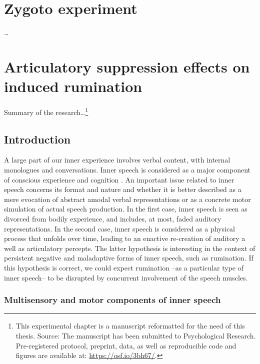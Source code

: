 \documentclass[12pt,]{book}
\let\rmarkdownfootnote\footnote%
\def\footnote{\protect\rmarkdownfootnote}
\theoremstyle{definition}
\theoremstyle{definition}
\theoremstyle{definition}
\theoremstyle{remark}
\begin{document}
\chapter{Zygoto experiment}\label{zygoto-experiment}

\ldots{}

\chapter{Articulatory suppression effects on induced
rumination}\label{articulatory-suppression-effects-on-induced-rumination}

Summary of the research\ldots{}\footnote{This experimental chapter is a
  manuscript reformatted for the need of this thesis. Source: The
  manuscript has been submitted to Psychological Research.
  Pre-registered protocol, preprint, data, as well as reproducible code
  and figures are available at: \url{https://osf.io/3bh67/}.}

\section{Introduction}\label{introduction-1}

A large part of our inner experience involves verbal content, with
internal monologues and conversations. Inner speech is considered as a
major component of conscious experience and cognition
\citep{Hubbard2010, Klinger1987, Hurlburt2013}. An important issue
related to inner speech concerns its format and nature and whether it is
better described as a mere evocation of abstract amodal verbal
representations or as a concrete motor simulation of actual speech
production. In the first case, inner speech is seen as divorced from
bodily experience, and includes, at most, faded auditory
representations. In the second case, inner speech is considered as a
physical process that unfolds over time, leading to an enactive
re-creation of auditory a well as articulatory percepts. The latter
hypothesis is interesting in the context of persistent negative and
maladaptive forms of inner speech, such as rumination. If this
hypothesis is correct, we could expect rumination --as a particular type
of inner speech-- to be disrupted by concurrent involvement of the
speech muscles.

\subsection{Multisensory and motor components of inner
speech}\label{multisensory-and-motor-components-of-inner-speech}
\end{document}
